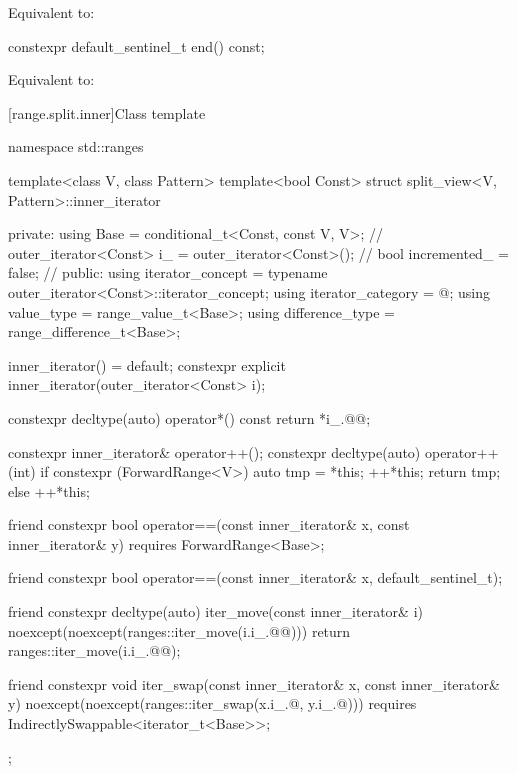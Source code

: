 \begin{itemdescr}
\pnum
\effects Equivalent to: 
\end{itemdescr}

%
\begin{itemdecl}
constexpr default_sentinel_t end() const;
\end{itemdecl}

\begin{itemdescr}
\pnum
\effects Equivalent to: 
\end{itemdescr}

[range.split.inner]{Class template }

\begin{codeblock}
namespace std::ranges {
  template<class V, class Pattern>
  template<bool Const>
  struct split_view<V, Pattern>::inner_iterator {
  private:
    using Base =
      conditional_t<Const, const V, V>;                 // \expos
    outer_iterator<Const> i_ = outer_iterator<Const>(); // \expos
    bool incremented_ = false;                          // \expos
  public:
    using iterator_concept  = typename outer_iterator<Const>::iterator_concept;
    using iterator_category = @\seebelow@;
    using value_type        = range_value_t<Base>;
    using difference_type   = range_difference_t<Base>;

    inner_iterator() = default;
    constexpr explicit inner_iterator(outer_iterator<Const> i);

    constexpr decltype(auto) operator*() const { return *i_.@@; }

    constexpr inner_iterator& operator++();
    constexpr decltype(auto) operator++(int) {
      if constexpr (ForwardRange<V>) {
        auto tmp = *this;
        ++*this;
        return tmp;
      } else
        ++*this;
    }

    friend constexpr bool operator==(const inner_iterator& x, const inner_iterator& y)
      requires ForwardRange<Base>;

    friend constexpr bool operator==(const inner_iterator& x, default_sentinel_t);

    friend constexpr decltype(auto) iter_move(const inner_iterator& i)
    noexcept(noexcept(ranges::iter_move(i.i_.@@))) {
      return ranges::iter_move(i.i_.@@);
    }

    friend constexpr void iter_swap(const inner_iterator& x, const inner_iterator& y)
      noexcept(noexcept(ranges::iter_swap(x.i_.@, y.i_.@)))
      requires IndirectlySwappable<iterator_t<Base>>;
  };
}
\end{codeblock}

